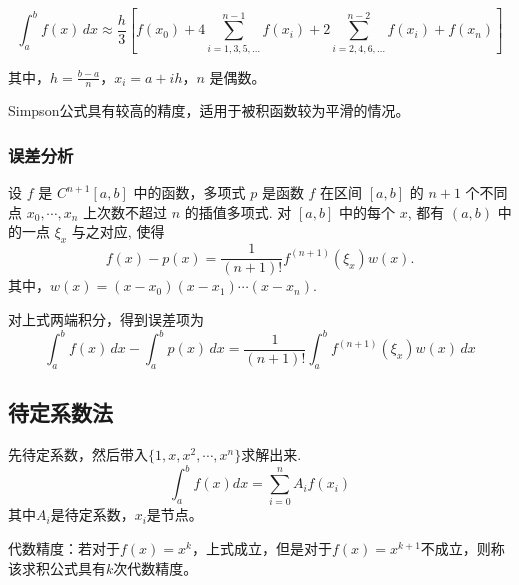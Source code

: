 \[
    \int_a^b f(x) \, dx \approx \frac{h}{3} \left[ f(x_0) + 4 \sum_{i=1,3,5,\ldots}^{n-1} f(x_i) + 2 \sum_{i=2,4,6,\ldots}^{n-2} f(x_i) + f(x_n) \right]
\]

其中，$h = \frac{b-a}{n}$，$x_i = a + ih$，$n$ 是偶数。

Simpson公式具有较高的精度，适用于被积函数较为平滑的情况。

\subsubsection{误差分析}

\begin{theorem}[插值多项式误差定理]
    设 $f$ 是 $C^{n+1}[a, b]$ 中的函数，多项式 $p$ 是函数 $f$ 在区间 $[a, b]$ 的 $n+1$ 个不同点 $x_0, \cdots, x_n$ 上次数不超过 $n$ 的插值多项式. 对 $[a, b]$ 中的每个 $x$, 都有 $(a, b)$ 中的一点 $\xi_x$ 与之对应, 使得
    \[
        f(x)-p(x)=\frac{1}{(n+1)!} f^{(n+1)}\left(\xi_x\right) w(x) .
    \]
    其中，$w(x) = (x - x_0)(x - x_1) \cdots (x - x_n)$.
\end{theorem}
对上式两端积分，得到误差项为
\[
    \int_a^b f(x) \, dx - \int_a^b p(x) \, dx = \frac{1}{(n+1)!}\int_a^b  f^{(n+1)}\left(\xi_x\right) w(x) \, dx
\]


\subsection{待定系数法}

先待定系数，然后带入$\{ 1,x,x^2,\cdots,x^n \}$求解出来.
\[
    \int_a^b f(x)dx=\sum_{i=0}^n A_i f(x_i)
\]
其中$A_i$是待定系数，$x_i$是节点。

代数精度：若对于$f(x)=x^k$，上式成立，但是对于$f(x)=x^{k+1}$不成立，则称该求积公式具有$k$次代数精度。





